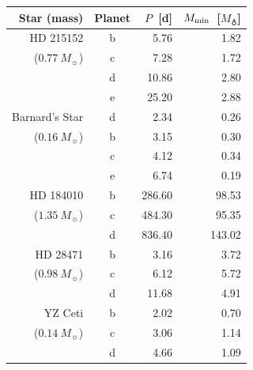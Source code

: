 \begin{tabular}{rcrr}
\hline
Star (mass) & Planet & $P$~[d] & $M_{\rm min}$~[$M_{\earth}$] \\

\hline
HD 215152 & b & 5.76 & 1.82 \\
($0.77~M_{\sun}$) & c & 7.28 & 1.72 \\
 & d & 10.86 & 2.80 \\
 & e & 25.20 & 2.88 \\
\hline
Barnard's Star & d & 2.34 & 0.26 \\
($0.16~M_{\sun}$) & b & 3.15 & 0.30 \\
 & c & 4.12 & 0.34 \\
 & e & 6.74 & 0.19 \\
\hline
HD 184010 & b & 286.60 & 98.53 \\
($1.35~M_{\sun}$) & c & 484.30 & 95.35 \\
 & d & 836.40 & 143.02 \\
\hline
HD 28471 & b & 3.16 & 3.72 \\
($0.98~M_{\sun}$) & c & 6.12 & 5.72 \\
 & d & 11.68 & 4.91 \\
\hline
YZ Ceti & b & 2.02 & 0.70 \\
($0.14~M_{\sun}$) & c & 3.06 & 1.14 \\
 & d & 4.66 & 1.09 \\
\hline
\end{tabular}
